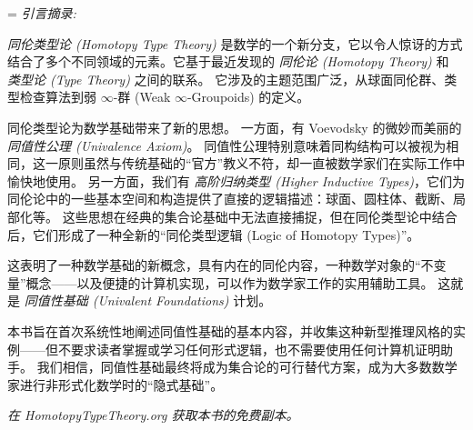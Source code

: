 
  {
  \parindent=0pt
  \parskip=\baselineskip
  {\OPTbacktitlefont
  \textit{引言摘录:}}
  \OPTbackfont

  \emph{同伦类型论 (Homotopy Type Theory)} 是数学的一个新分支，它以令人惊讶的方式结合了多个不同领域的元素。它基于最近发现的 \emph{同伦论 (Homotopy Theory)} 和 \emph{类型论 (Type Theory)} 之间的联系。
  它涉及的主题范围广泛，从球面同伦群、类型检查算法到弱 $\infty$-群 (Weak $\infty$-Groupoids) 的定义。

  同伦类型论为数学基础带来了新的思想。
  一方面，有 Voevodsky 的微妙而美丽的 \emph{同值性公理 (Univalence Axiom)}。
  同值性公理特别意味着同构结构可以被视为相同，这一原则虽然与传统基础的“官方”教义不符，却一直被数学家们在实际工作中愉快地使用。
  另一方面，我们有 \emph{高阶归纳类型 (Higher Inductive Types)}，它们为同伦论中的一些基本空间和构造提供了直接的逻辑描述：球面、圆柱体、截断、局部化等。
  这些思想在经典的集合论基础中无法直接捕捉，但在同伦类型论中结合后，它们形成了一种全新的“同伦类型逻辑 (Logic of Homotopy Types)”。

  这表明了一种数学基础的新概念，具有内在的同伦内容，一种数学对象的“不变量”概念——以及便捷的计算机实现，可以作为数学家工作的实用辅助工具。
  这就是 \emph{同值性基础 (Univalent Foundations)} 计划。

  本书旨在首次系统性地阐述同值性基础的基本内容，并收集这种新型推理风格的实例——但不要求读者掌握或学习任何形式逻辑，也不需要使用任何计算机证明助手。
  我们相信，同值性基础最终将成为集合论的可行替代方案，成为大多数数学家进行非形式化数学时的“隐式基础”。

  \bigskip

  \begin{center}
  {\Large
  \textit{在 HomotopyTypeTheory.org 获取本书的免费副本。}}
  \end{center}
}
